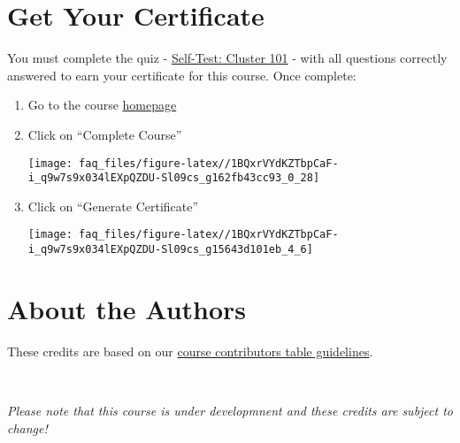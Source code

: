 \documentclass[
]{book}
\begin{document}
\hypertarget{get-your-certificate}{%
\chapter*{Get Your Certificate}\label{get-your-certificate}}

You must complete the quiz - \href{https://leanpub.com/courses/fredhutch/fredhutchcluster101/quizzes/self_test_101}{Self-Test: Cluster 101} -
with all questions correctly answered to earn your certificate for this course. Once complete:

\begin{enumerate}
\def\labelenumi{\arabic{enumi}.}
\item
  Go to the course \href{https://leanpub.com/courses/fredhutch/fredhutchcluster101/home}{homepage}\\
\item
  Click on ``Complete Course''

  \texttt{[image: faq\_files/figure-latex//1BQxrVYdKZTbpCaF-i\_q9w7s9x034lEXpQZDU-Sl09cs\_g162fb43cc93\_0\_28]}
\item
  Click on ``Generate Certificate''

  \texttt{[image: faq\_files/figure-latex//1BQxrVYdKZTbpCaF-i\_q9w7s9x034lEXpQZDU-Sl09cs\_g15643d101eb\_4\_6]}
\end{enumerate}

\hypertarget{about-the-authors}{%
\chapter*{About the Authors}\label{about-the-authors}}

These credits are based on our \href{https://github.com/jhudsl/OTTR_Template/wiki/How-to-give-credits}{course contributors table guidelines}.

~
~

\emph{Please note that this course is under developmnent and these credits are subject to change!}
\end{document}
